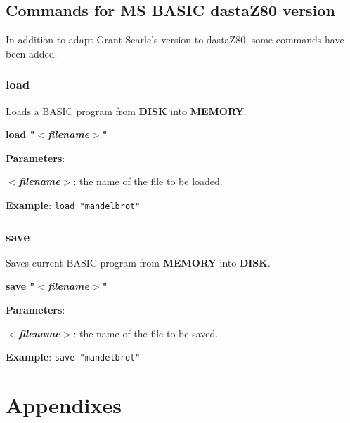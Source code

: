 \documentclass[a4paper,11pt]{article}
\begin{document}
    \subsection{Commands for MS BASIC dastaZ80 version}

    In addition to adapt Grant Searle's version to dastaZ80, some commands have
    been added.

    \subsubsection{{\color{blue}load}}
    Loads a BASIC program from \textbf{DISK} into \textbf{MEMORY}.

    \hspace{1.9cm}\textbf{load "\textit{$<$filename$>$}"}

    \textbf{Parameters}:

    \hspace{1cm}\textbf{\textit{$<$filename$>$}}: the name of the file to be
    loaded.

    \textbf{Example}: \texttt{load "mandelbrot"}

    \subsubsection{{\color{blue}save}}
    Saves current BASIC program from \textbf{MEMORY} into \textbf{DISK}.

    \hspace{1.9cm}\textbf{save "\textit{$<$filename$>$}"}

    \textbf{Parameters}:

    \hspace{1cm}\textbf{\textit{$<$filename$>$}}: the name of the file to be
    saved.

    \textbf{Example}: \texttt{save "mandelbrot"}

    \pagebreak
    \section{Appendixes}
    \label{sec:appendixes}
\end{document}
